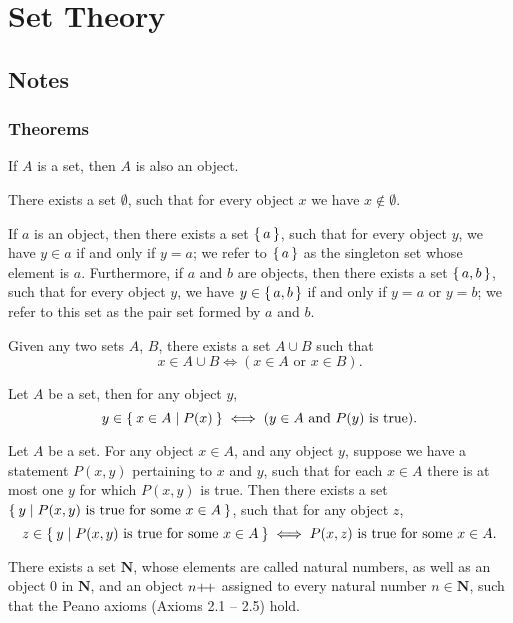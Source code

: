 \section{Set Theory}
\subsection{Notes}
\subsubsection{Theorems}
\begin{axiom}
    If $A$ is a set, then $A$ is also an object.
\end{axiom}
\begin{axiom}
    There exists a set $\emptyset$, such that for every object $x$ we have $x \notin \emptyset$.
\end{axiom}
\begin{axiom}
    If $a$ is an object, then there exists a set $\set{a}$, such that for every object $y$, we have $y\in{a}$ if and only if $y=a$; we refer to $\set{a}$ as the singleton set whose element is $a$. Furthermore, if $a$ and $b$ are objects, then there exists a set $\set{a, b}$, such that for every object $y$, we have $y \in \set{a, b}$ if and only if $y = a$ or $y = b$; we refer to this set as the pair set formed by $a$ and $b$.
\end{axiom}
\begin{axiom}
    Given any two sets $A$, $B$, there exists a set $A \cup B$ such that \[x\in A\cup B \iff (x\in A \text{ or } x\in B).\]
\end{axiom}
\begin{axiom}
    Let $A$ be a set, then for any object $y$, \[y\in \Set{x\in A | P(x)} \iff (y\in A \text{ and } P(y) \text{ is true}).\] 
\end{axiom}
\begin{axiom}[Replacement]
    Let $A$ be a set. For any object $x \in A$, and any object $y$, suppose we have a statement $P(x,y)$ pertaining to $x$ and $y$, such that for each $x \in A$ there is at most one $y$ for which $P(x,y)$ is true. Then there exists a set $\Set{y | P (x, y) \text{ is true for some } x \in A}$, such that for any object $z$, \[z \in \Set{y | P(x,y)\text{ is true for some }x \in A} \iff P(x,z)\text{ is true for some }x \in A.\]
\end{axiom}
\begin{axiom}[Infinity]
    There exists a set $\mathbf{N}$, whose elements are called natural numbers, as well as an object $0$ in $\mathbf{N}$, and an object $n{+}{\mkern-3mu}{+}$ assigned to every natural number $n \in \mathbf{N}$, such that the Peano axioms (Axioms 2.1 -- 2.5) hold.
\end{axiom}

